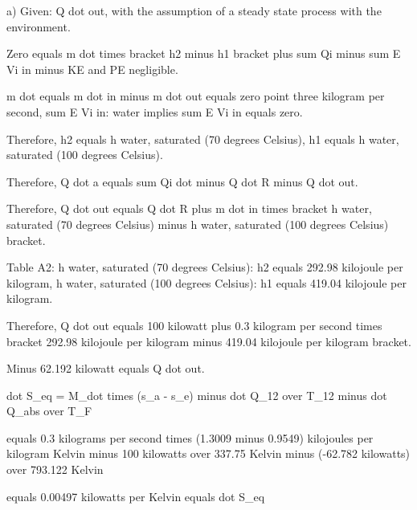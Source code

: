 a) Given: Q dot out, with the assumption of a steady state process with the environment.

Zero equals m dot times bracket h2 minus h1 bracket plus sum Qi minus sum E Vi in minus KE and PE negligible.

m dot equals m dot in minus m dot out equals zero point three kilogram per second, sum E Vi in: water implies sum E Vi in equals zero.

Therefore, h2 equals h water, saturated (70 degrees Celsius), h1 equals h water, saturated (100 degrees Celsius).

Therefore, Q dot a equals sum Qi dot minus Q dot R minus Q dot out.

Therefore, Q dot out equals Q dot R plus m dot in times bracket h water, saturated (70 degrees Celsius) minus h water, saturated (100 degrees Celsius) bracket.

Table A2: h water, saturated (70 degrees Celsius): h2 equals 292.98 kilojoule per kilogram, h water, saturated (100 degrees Celsius): h1 equals 419.04 kilojoule per kilogram.

Therefore, Q dot out equals 100 kilowatt plus 0.3 kilogram per second times bracket 292.98 kilojoule per kilogram minus 419.04 kilojoule per kilogram bracket.

Minus 62.192 kilowatt equals Q dot out.

dot S_eq = M_dot times (s_a - s_e) minus dot Q_12 over T_12 minus dot Q_abs over T_F

equals 0.3 kilograms per second times (1.3009 minus 0.9549) kilojoules per kilogram Kelvin minus 100 kilowatts over 337.75 Kelvin minus (-62.782 kilowatts) over 793.122 Kelvin

equals 0.00497 kilowatts per Kelvin equals dot S_eq